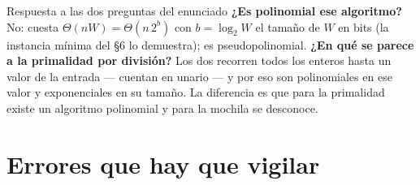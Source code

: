 \documentclass[11pt]{article}
\begin{document}
\begin{resultado}{Respuesta a las dos preguntas del enunciado}
\textbf{¿Es polinomial ese algoritmo?} No: cuesta $\Theta(nW)=\Theta(n\,2^b)$ con $b=\log_2W$ el tamaño de $W$
en bits (la instancia mínima del §6 lo demuestra); es pseudopolinomial. \textbf{¿En qué se parece a la
primalidad por división?} Los dos recorren todos los enteros hasta un valor de la entrada --- cuentan en
unario --- y por eso son polinomiales en ese valor y exponenciales en su tamaño. La diferencia es que para la
primalidad existe un algoritmo polinomial y para la mochila se desconoce.
\end{resultado}

\section*{Errores que hay que vigilar}
\end{document}
